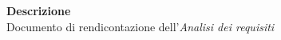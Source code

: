 \begin{titlepage}
\begin{center}
	\large \textbf{Descrizione} \\ Documento di rendicontazione dell'\textit{Analisi dei requisiti}
	
	
	\end{center}
\end{titlepage}
